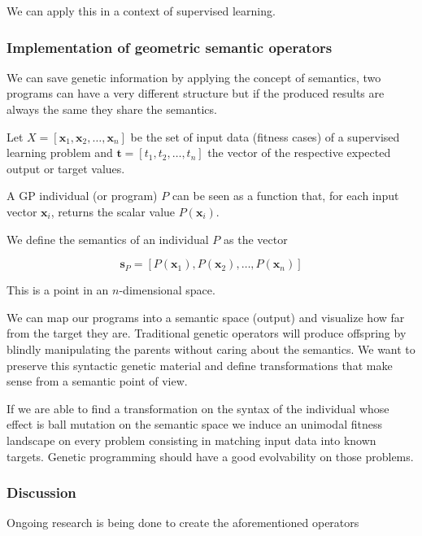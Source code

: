 We can apply this in a context of supervised learning. 

\subsubsection{Implementation of geometric semantic operators}

We can save genetic information by applying the concept of semantics, two programs can have a very different structure but if the produced results are always the same they share the semantics. 

Let $X = [\mathbf{x}_1, \mathbf{x}_2, \ldots, \mathbf{x}_n]$ be the set of input data (fitness cases) of a supervised learning problem and $\mathbf{t} = [t_1, t_2, \ldots, t_n]$ the vector of the respective expected output or target values.

A GP individual (or program) $P$ can be seen as a function that, for each input vector $\mathbf{x}_i$, returns the scalar value $P(\mathbf{x}_i)$.

We define the semantics of an individual $P$ as the vector

\[
\mathbf{s}_P = [P(\mathbf{x}_1), P(\mathbf{x}_2), \ldots, P(\mathbf{x}_n)]
\]

This is a point in an $n$-dimensional space.

\vspace{10pt}

We can map our programs into a semantic space (output) and visualize how far from the target they are. Traditional genetic operators will produce offspring by blindly manipulating the parents without caring about the semantics. We want to preserve this syntactic genetic material and define transformations that make sense from a semantic point of view. 

\vspace{10pt}

If we are able to find a transformation on the syntax of the individual whose effect is ball mutation on the semantic space we induce an unimodal fitness landscape on every problem consisting in matching input data into known targets. Genetic programming should have a good evolvability on those problems.  


\subsubsection{Discussion}

Ongoing research is being done to create the aforementioned operators

